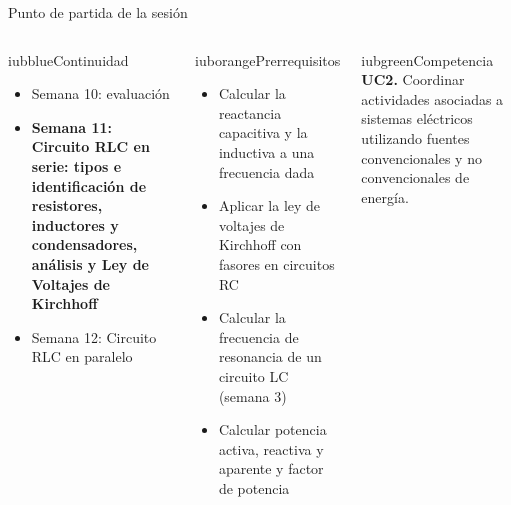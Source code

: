 \documentclass[aspectratio=169,11pt,xcolor={table}]{beamer}
\begin{document}
\begin{frame}{Punto de partida de la sesión}
\begin{columns}[T,onlytextwidth]
\begin{caja}[height=5.9cm]{iubblue}{Continuidad}
\scriptsize \begin{itemize}\setlength{\itemsep}{2pt}
  \item Semana 10: evaluación
  \item \textbf{Semana 11: Circuito RLC en serie: tipos e identificación de resistores, inductores y condensadores, análisis y Ley de Voltajes de Kirchhoff}
  \item Semana 12: Circuito RLC en paralelo
\end{itemize}
\end{caja}
\begin{caja}[height=5.9cm]{iuborange}{Prerrequisitos}
\scriptsize \begin{itemize}\setlength{\itemsep}{2pt}
  \item Calcular la reactancia capacitiva y la inductiva a una frecuencia dada
  \item Aplicar la ley de voltajes de Kirchhoff con fasores en circuitos RC
  \item Calcular la frecuencia de resonancia de un circuito LC (semana 3)
  \item Calcular potencia activa, reactiva y aparente y factor de potencia
\end{itemize}
\end{caja}
\begin{caja}[height=5.9cm]{iubgreen}{Competencia}
\scriptsize \textbf{UC2.} Coordinar actividades asociadas a sistemas eléctricos utilizando fuentes convencionales y no convencionales de energía.
\end{caja}
\end{columns}
\end{frame}
\end{document}
